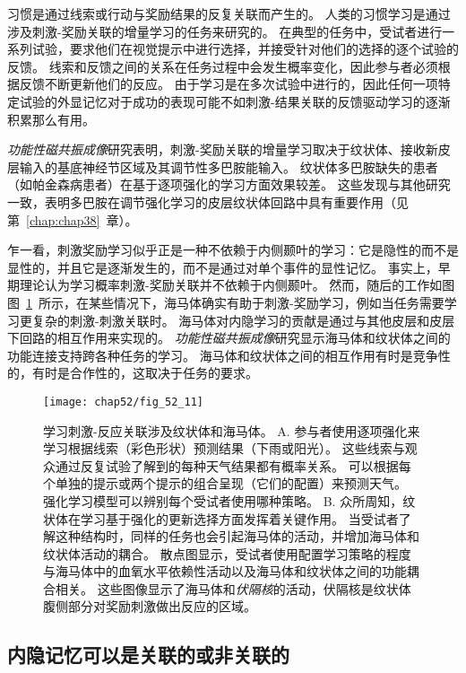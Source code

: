 习惯是通过线索或行动与奖励结果的反复关联而产生的。
人类的习惯学习是通过涉及刺激-奖励关联的增量学习的任务来研究的。
在典型的任务中，受试者进行一系列试验，要求他们在视觉提示中进行选择，并接受针对他们的选择的逐个试验的反馈。
线索和反馈之间的关系在任务过程中会发生概率变化，因此参与者必须根据反馈不断更新他们的反应。
由于学习是在多次试验中进行的，因此任何一项特定试验的外显记忆对于成功的表现可能不如刺激-结果关联的反馈驱动学习的逐渐积累那么有用。


\textit{功能性磁共振成像}研究表明，刺激-奖励关联的增量学习取决于纹状体、接收新皮层输入的基底神经节区域及其调节性多巴胺能输入。
纹状体多巴胺缺失的患者（如帕金森病患者）在基于逐项强化的学习方面效果较差。
这些发现与其他研究一致，表明多巴胺在调节强化学习的皮层纹状体回路中具有重要作用（见第~\ref{chap:chap38}~章）。


乍一看，刺激奖励学习似乎正是一种不依赖于内侧颞叶的学习：它是隐性的而不是显性的，并且它是逐渐发生的，而不是通过对单个事件的显性记忆。
事实上，早期理论认为学习概率刺激-奖励关联并不依赖于内侧颞叶。
然而，随后的工作如图图~\ref{fig:52_11}~所示，在某些情况下，海马体确实有助于刺激-奖励学习，例如当任务需要学习更复杂的刺激-刺激关联时。
海马体对内隐学习的贡献是通过与其他皮层和皮层下回路的相互作用来实现的。
\textit{功能性磁共振成像}研究显示海马体和纹状体之间的功能连接支持跨各种任务的学习。
海马体和纹状体之间的相互作用有时是竞争性的，有时是合作性的，这取决于任务的要求。


\begin{figure}[htbp]
	\centering
	\texttt{[image: chap52/fig\_52\_11]}
	\caption{学习刺激-反应关联涉及纹状体和海马体\cite{duncan2018more}。
		A. 参与者使用逐项强化来学习根据线索（彩色形状）预测结果（下雨或阳光）。
		这些线索与观众通过反复试验了解到的每种天气结果都有概率关系。
		可以根据每个单独的提示或两个提示的组合呈现（它们的配置）来预测天气。
		强化学习模型可以辨别每个受试者使用哪种策略。
		B. 众所周知，纹状体在学习基于强化的更新选择方面发挥着关键作用。
		当受试者了解这种结构时，同样的任务也会引起海马体的活动，并增加海马体和纹状体活动的耦合。
		散点图显示，受试者使用配置学习策略的程度与海马体中的血氧水平依赖性活动以及海马体和纹状体之间的功能耦合相关。
		这些图像显示了海马体和\textit{伏隔核}的活动，伏隔核是纹状体腹侧部分对奖励刺激做出反应的区域。}
	\label{fig:52_11}
\end{figure}



\subsection{内隐记忆可以是关联的或非关联的}

